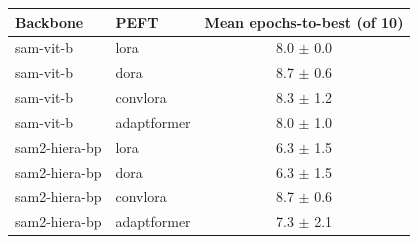 \begin{tabular}{llc}
\toprule
Backbone & PEFT & Mean epochs-to-best (of 10) \\
\midrule
sam-vit-b & lora & 8.0 $\pm$ 0.0 \\
sam-vit-b & dora & 8.7 $\pm$ 0.6 \\
sam-vit-b & convlora & 8.3 $\pm$ 1.2 \\
sam-vit-b & adaptformer & 8.0 $\pm$ 1.0 \\
sam2-hiera-bp & lora & 6.3 $\pm$ 1.5 \\
sam2-hiera-bp & dora & 6.3 $\pm$ 1.5 \\
sam2-hiera-bp & convlora & 8.7 $\pm$ 0.6 \\
sam2-hiera-bp & adaptformer & 7.3 $\pm$ 2.1 \\
\bottomrule
\end{tabular}

